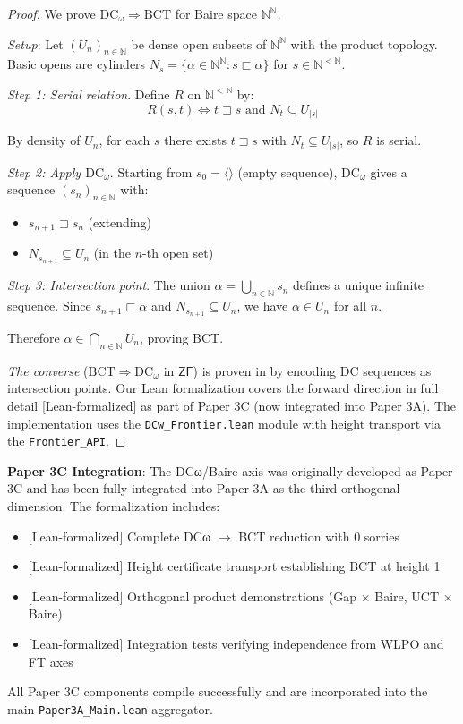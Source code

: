 \documentclass[11pt]{article}
\theoremstyle{plain}
\theoremstyle{definition}
\newcommand{\N}{\mathbb{N}}
\newcommand{\DCw}{\mathrm{DC}_\omega}
\newcommand{\BCT}{\mathrm{BCT}}
\newcommand{\ZF}{\mathsf{ZF}}
\newcommand{\leanok}{\textsf{\textcolor{green!70!black}{[Lean-formalized]}}}
\begin{document}
\begin{proof}
We prove $\DCw \Rightarrow \BCT$ for Baire space $\N^\N$.

\emph{Setup}: Let $(U_n)_{n \in \N}$ be dense open subsets of $\N^\N$ with the product topology. Basic opens are cylinders $N_s = \{\alpha \in \N^\N : s \sqsubset \alpha\}$ for $s \in \N^{<\N}$.

\emph{Step 1: Serial relation}. Define $R$ on $\N^{<\N}$ by:
\[
R(s, t) \iff t \sqsupset s \text{ and } N_t \subseteq U_{|s|}
\]

By density of $U_n$, for each $s$ there exists $t \sqsupset s$ with $N_t \subseteq U_{|s|}$, so $R$ is serial.

\emph{Step 2: Apply $\DCw$}. Starting from $s_0 = \langle\rangle$ (empty sequence), $\DCw$ gives a sequence $(s_n)_{n \in \N}$ with:
\begin{itemize}
\item $s_{n+1} \sqsupset s_n$ (extending)
\item $N_{s_{n+1}} \subseteq U_n$ (in the $n$-th open set)
\end{itemize}

\emph{Step 3: Intersection point}. The union $\alpha = \bigcup_{n \in \N} s_n$ defines a unique infinite sequence. Since $s_{n+1} \sqsubset \alpha$ and $N_{s_{n+1}} \subseteq U_n$, we have $\alpha \in U_n$ for all $n$.

Therefore $\alpha \in \bigcap_{n \in \N} U_n$, proving BCT.

\emph{The converse} ($\BCT \Rightarrow \DCw$ in $\ZF$) is proven in \cite{Blair77} by encoding DC sequences as intersection points. Our Lean formalization covers the forward direction in full detail \leanok{} as part of Paper 3C (now integrated into Paper 3A). The implementation uses the \texttt{DCw\_Frontier.lean} module with height transport via the \texttt{Frontier\_API}.
\end{proof}

\begin{formalbox}
\textbf{Paper 3C Integration}: The DCω/Baire axis was originally developed as Paper 3C and has been fully integrated into Paper 3A as the third orthogonal dimension. The formalization includes:
\begin{itemize}
\item \leanok{} Complete DCω $\rightarrow$ BCT reduction with 0 sorries
\item \leanok{} Height certificate transport establishing BCT at height 1
\item \leanok{} Orthogonal product demonstrations (Gap × Baire, UCT × Baire)
\item \leanok{} Integration tests verifying independence from WLPO and FT axes
\end{itemize}
All Paper 3C components compile successfully and are incorporated into the main \texttt{Paper3A\_Main.lean} aggregator.
\end{formalbox}
\end{document}
